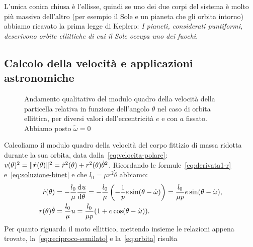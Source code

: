 L'unica conica chiusa è l'ellisse, quindi se uno dei due corpi del sistema è
molto più massivo dell'altro (per esempio il Sole e un pianeta che gli orbita
intorno) abbiamo ricavato la prima legge di Keplero: \emph{I pianeti,
  considerati puntiformi, descrivono orbite ellittiche di cui il Sole occupa uno
  dei fuochi}.

\subsection{Calcolo della velocità e applicazioni astronomiche}
\label{sec:velocita}
\begin{figure}
  \centering
  
  \caption[Andamento della velocità in funzione dell'anomalia]{Andamento
    qualitativo del modulo quadro della velocità della particella relativa in
    funzione dell'angolo $\theta$ nel caso di orbita ellittica, per diversi
    valori dell'eccentricità $e$ e con $a$ fissato. Abbiamo posto
    $\tilde\omega=0$}
  \label{fig:velocita}
\end{figure}
Calcoliamo il modulo quadro della velocità del corpo fittizio di massa ridotta
durante la sua orbita, data dalla~\eqref{eq:velocita-polare}: $v(\theta)^2 =
\lVert\dot{\bm{r}}(\theta)\rVert^2 = \dot{r}^2(\theta) +
r^2(\theta)\dot{\theta}^2$. Ricordando le formule~\eqref{eq:derivata1-r}
e~\eqref{eq:soluzione-binet} e che $l_0=\mu r^2\dot{\theta}$ abbiamo:
\begin{subequations}
  \begin{align}
    \dot{r}(\theta) &= -\frac{l_0}{\mu}\frac{{\mathop{}\!\mathrm{d}^{}}u}{\mathop{}\!\mathrm{d} {\theta}^{}} = -\frac{l_0}{\mu}
    \left(
      -\frac{1}{p}e\sin(\theta-\tilde\omega)
    \right) = \frac{l_0}{\mu p}e\sin(\theta-\tilde\omega), \\
    r(\theta)\dot{\theta} &= \frac{l_0}{\mu}u = \frac{l_0}{\mu
      p}(1+e\cos(\theta-\tilde\omega)).
  \end{align}
\end{subequations}
Per quanto riguarda il moto ellittico, mettendo insieme le relazioni appena
trovate, la~\eqref{eq:reciproco-semilato} e la~\eqref{eq:orbita} risulta
